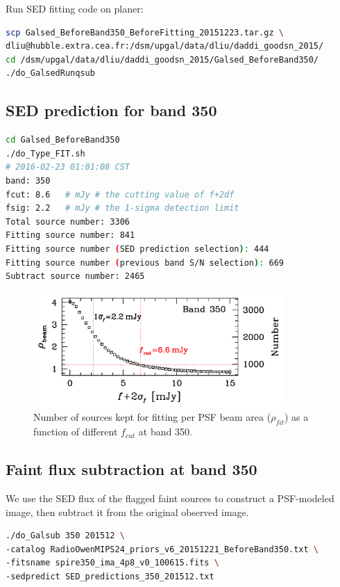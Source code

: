 \documentclass[11pt,a4paper]{article}
\begin{document}
Run SED fitting code on planer:

\begin{lstlisting}[language=bash]
scp Galsed_BeforeBand350_BeforeFitting_20151223.tar.gz \
dliu@hubble.extra.cea.fr:/dsm/upgal/data/dliu/daddi_goodsn_2015/
cd /dsm/upgal/data/dliu/daddi_goodsn_2015/Galsed_BeforeBand350/
./do_GalsedRunqsub
\end{lstlisting}

\subsection{SED prediction for band 350}
\label{Band350_Galpre}

\begin{lstlisting}[language=bash]
cd Galsed_BeforeBand350
./do_Type_FIT.sh
# 2016-02-23 01:01:08 CST
band: 350
fcut: 8.6   # mJy # the cutting value of f+2df
fsig: 2.2   # mJy # the 1-sigma detection limit
Total source number: 3306
Fitting source number: 841
Fitting source number (SED prediction selection): 444
Fitting source number (previous band S/N selection): 669
Subtract source number: 2465
\end{lstlisting}

\begin{figure}[H]
	\caption{Number of sources kept for fitting per PSF beam area ($\rho_{fit}$) as a function of different $f_{cut}$ at band 350.}
	\includegraphics[width=0.85\textwidth]{plot_cutting_flux_350}
\end{figure}

\subsection{Faint flux subtraction at band 350}
\label{Band350_Galsub}

We use the SED flux of the flagged faint sources to construct a PSF-modeled image, then subtract it from the original observed image. 

\begin{lstlisting}[language=bash]
./do_Galsub 350 201512 \
-catalog RadioOwenMIPS24_priors_v6_20151221_BeforeBand350.txt \
-fitsname spire350_ima_4p8_v0_100615.fits \
-sedpredict SED_predictions_350_201512.txt
\end{lstlisting}
\end{document}
